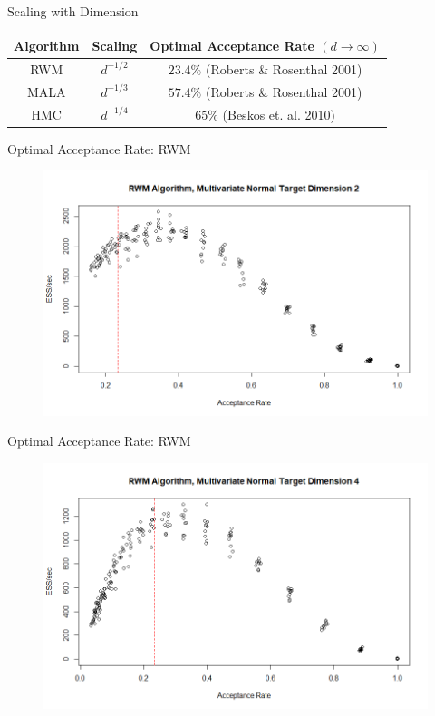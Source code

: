 \documentclass{beamer}
\begin{document}
\begin{frame}{Scaling with Dimension}

\begin{table}
\centering
\begin{tabular}{|c||c|c|}
\hline
Algorithm & Scaling & Optimal Acceptance Rate $(d \to \infty)$ \\
\hline
RWM & $d^{-1/2}$ & $23.4\%$ (Roberts \& Rosenthal 2001) \\
MALA & $d^{-1/3}$ & $57.4\%$ (Roberts \& Rosenthal 2001) \\
HMC & $d^{-1/4}$ & $65\%$ (Beskos et. al. 2010) \\
\hline
\end{tabular}
\end{table}

\end{frame}


\begin{frame}{Optimal Acceptance Rate: RWM}

\begin{figure}
\centering
\includegraphics[scale = 0.4]{RWM_Optimal2.png}
\end{figure}

\end{frame}


\begin{frame}{Optimal Acceptance Rate: RWM}
\begin{figure}
\centering
\includegraphics[scale = 0.4]{RWM_Optimal4.png}
\end{figure}
\end{frame}
\end{document}
